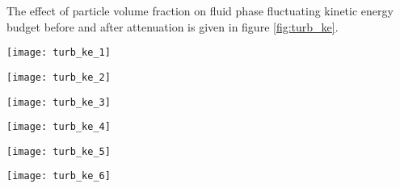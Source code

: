 \documentclass[aip,graphicx]{revtex4-1}
\begin{document}
The effect of particle volume fraction on fluid phase fluctuating kinetic energy budget before and after attenuation is given in figure \ref{fig:turb_ke}.\\
\begin{figure*}[!h]
 \begin{minipage}{0.5\textwidth}
 	{\texttt{[image: turb\_ke\_1]}}
 	\caption*{(a)}
 \end{minipage}\hfill
\begin{minipage}{0.5\textwidth}
 	{\texttt{[image: turb\_ke\_2]}}
 	\caption*{(b)}
 \end{minipage}\hfill
 \begin{minipage}{0.5\textwidth}
 	{\texttt{[image: turb\_ke\_3]}}
 	\caption*{(c)}
 \end{minipage}\hfill
 \begin{minipage}{0.5\textwidth}
 	{\texttt{[image: turb\_ke\_4]}}
 	\caption*{(d)}
\end{minipage}\hfill
 \begin{minipage}{0.5\textwidth}
 	{\texttt{[image: turb\_ke\_5]}}
	\caption*{(e)}
\end{minipage}\hfill
\begin{minipage}{0.5\textwidth}
	{\texttt{[image: turb\_ke\_6]}}
	\caption*{(f)}
\end{minipage}\hfill
 	\caption{Fluid phase fluctuating kinetic energy budget at various volume fractions (a) $\phi=1.75\times10^{-4}$, (b) $\phi=3.5\times10^{-4}$, (c) $\phi=7\times10^{-4}$, (d) $\phi=7.875\times10^{-4}$, (e) $\phi=8.3125\times10^{-4}$ and (f) $\phi=8.75\times10^{-4}$}	
 	\label{fig:turb_ke}		       
 \end{figure*}
\end{document}
